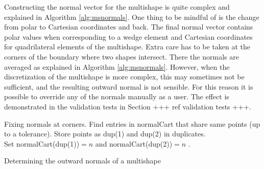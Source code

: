 \documentclass[11pt, a4paper]{article}
\theoremstyle{definition}
\begin{document}
Constructing the normal vector for the multishape is quite complex and explained in Algorithm \ref{alg:msnormals}. One thing to be mindful of is the change from polar to Cartesian coordinates and back. The final normal vector contains polar values when corresponding to a wedge element and Cartesian coordinates for quadrilateral elements of the multishape. Extra care has to be taken at the corners of the boundary where two shapes intersect. There the normals are averaged as explained in Algorithm \ref{alg:msnormals}. However, when the discretization of the multishape is more complex, this may sometimes not be sufficient, and the resulting outward normal is not sensible. For this reason it is possible to override any of the normals manually as a user. The effect is demonstrated in the validation tests in Section +++ ref validation tests +++.
\\
\begin{algorithm}[H]
	\SetAlgoLined
	
	Fixing normals at corners. Find entries in normalCart that share  same points (up to a tolerance). Store points as dup(1) and dup(2) in duplicates. \\
	Set normalCart(dup(1))$ = n $ and normalCart(dup(2))$=n$ . \\
		
	\caption{Determining the outward normals of a multishape}
	\label{alg:msnormals}
\end{algorithm}
\end{document}
